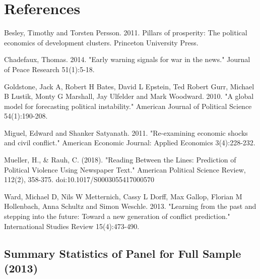 \section*{References}
Besley, Timothy and Torsten Persson. 2011. Pillars of prosperity: The political economics \newline \indent of development clusters. Princeton University Press.\vspace{0.25cm}

\noindent Chadefaux, Thomas. 2014. "Early warning signals for war in the news." Journal of Peace \newline \indent Research 51(1):5-18.\vspace{0.25cm}

\noindent Goldstone, Jack A, Robert H Bates, David L Epstein, Ted Robert Gurr, Michael B Lustik, \newline \indent Monty G Marshall, Jay Ulfelder and Mark Woodward. 2010. "A global model for \newline \indent forecasting political instability." American Journal of Political Science 54(1):190-208.\vspace{0.25cm}

\noindent Miguel, Edward and Shanker Satyanath. 2011. "Re-examining economic shocks and civil \newline \indent conflict." American Economic Journal: Applied Economics 3(4):228-232.\vspace{0.25cm}

\noindent Mueller, H., & Rauh, C. (2018). "Reading Between the Lines: Prediction of Political \newline \indent Violence Using Newspaper Text." American Political Science Review, 112(2), 358-375. \newline \indent doi:10.1017/S0003055417000570\vspace{0.25cm}

\noindent Ward, Michael D, Nils W Metternich, Cassy L Dorff, Max Gallop, Florian M Hollenbach, \newline \indent Anna Schultz and Simon Weschle. 2013. "Learning from the past and stepping into \newline \indent the future: Toward a new generation of conflict prediction." International Studies \newline \indent Review 15(4):473-490.

\clearpage

\subsection*{Summary Statistics of Panel for Full Sample (2013)}



